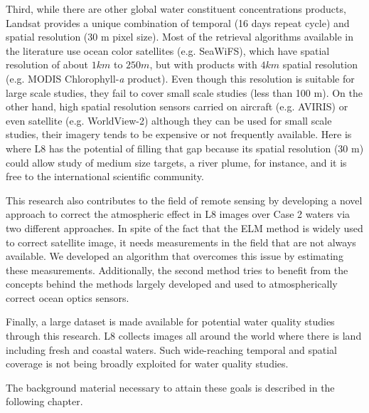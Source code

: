 Third, while there are other global water constituent concentrations products, Landsat provides a unique combination of temporal (16 days repeat cycle) and spatial resolution (30 m pixel size). Most of the retrieval algorithms available in the literature use ocean color satellites (e.g. SeaWiFS), which have spatial resolution of about $1 km$ to $250 m$, but with products with $4km$ spatial resolution (e.g. MODIS Chlorophyll-{\it a} product). Even though this resolution is suitable for large scale studies, they fail to cover small scale studies (less than 100 m). On the other hand, high spatial resolution sensors carried on aircraft (e.g. AVIRIS) or even satellite (e.g. WorldView-2) although they can be used for small scale studies, their imagery tends to be expensive or not frequently available. Here is where L8 has the potential of filling that gap because its spatial resolution (30 m) could allow study of medium size targets, a river plume, for instance, and it is free to the international scientific community.

This research also contributes to the field of remote sensing by developing a novel approach to correct the atmospheric effect in L8 images over Case 2 waters via two different approaches. In spite of the fact that the ELM method is widely used to correct satellite image, it needs measurements in the field that are not always available. We developed an algorithm that overcomes this issue by estimating these measurements. Additionally, the { \color{red} second method} tries to benefit from the concepts behind the methods largely developed and used to atmospherically correct ocean optics sensors.

Finally, a large dataset is made available for potential water quality studies through this research. L8 collects images all around the world where there is land including fresh and coastal waters. Such wide-reaching temporal and spatial coverage is not being broadly exploited for water quality studies.

The background material necessary to attain these goals is described in the following chapter.
